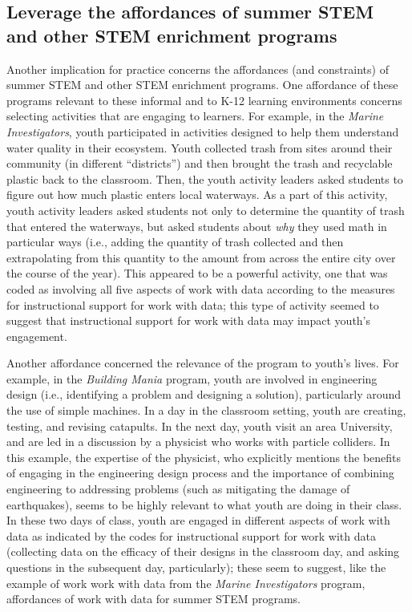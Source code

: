 \documentclass[]{msu-thesis}
\theoremstyle{definition}
\theoremstyle{definition}
\theoremstyle{definition}
\theoremstyle{remark}
\begin{document}
\subsection{Leverage the affordances of summer STEM and other STEM
enrichment
programs}\label{leverage-the-affordances-of-summer-stem-and-other-stem-enrichment-programs}

Another implication for practice concerns the affordances (and
constraints) of summer STEM and other STEM enrichment programs. One
affordance of these programs relevant to these informal and to K-12
learning environments concerns selecting activities that are engaging to
learners. For example, in the \emph{Marine Investigators}, youth
participated in activities designed to help them understand water
quality in their ecosystem. Youth collected trash from sites around
their community (in different ``districts'') and then brought the trash
and recyclable plastic back to the classroom. Then, the youth activity
leaders asked students to figure out how much plastic enters local
waterways. As a part of this activity, youth activity leaders asked
students not only to determine the quantity of trash that entered the
waterways, but asked students about \emph{why} they used math in
particular ways (i.e., adding the quantity of trash collected and then
extrapolating from this quantity to the amount from across the entire
city over the course of the year). This appeared to be a powerful
activity, one that was coded as involving all five aspects of work with
data according to the measures for instructional support for work with
data; this type of activity seemed to suggest that instructional support
for work with data may impact youth's engagement.

Another affordance concerned the relevance of the program to youth's
lives. For example, in the \emph{Building Mania} program, youth are
involved in engineering design (i.e., identifying a problem and
designing a solution), particularly around the use of simple machines.
In a day in the classroom setting, youth are creating, testing, and
revising catapults. In the next day, youth visit an area University, and
are led in a discussion by a physicist who works with particle
colliders. In this example, the expertise of the physicist, who
explicitly mentions the benefits of engaging in the engineering design
process and the importance of combining engineering to addressing
problems (such as mitigating the damage of earthquakes), seems to be
highly relevant to what youth are doing in their class. In these two
days of class, youth are engaged in different aspects of work with data
as indicated by the codes for instructional support for work with data
(collecting data on the efficacy of their designs in the classroom day,
and asking questions in the subsequent day, particularly); these seem to
suggest, like the example of work work with data from the \emph{Marine
Investigators} program, affordances of work with data for summer STEM
programs.
\end{document}
